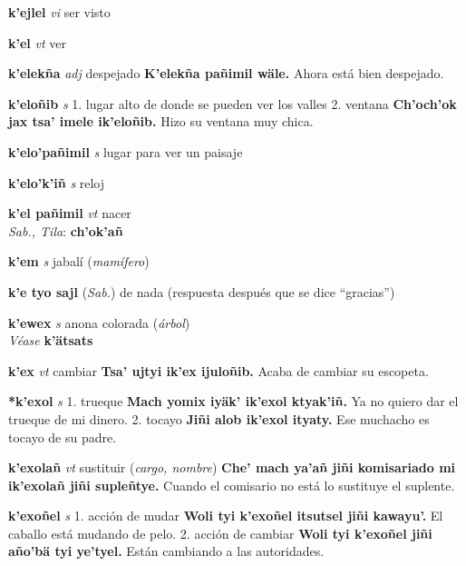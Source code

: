 \documentclass[10pt]{scrbook}
\newcommand{\entry}[1]{\textbf{#1}}
\newcommand{\onedefinition}[1]{#1.}
\newcommand{\partofspeech}[1]{\textit{#1}}
\newcommand{\spanishtranslation}[1]{#1}
\newcommand{\clarification}[1]{(\textit{#1})}
\newcommand{\cholexample}[1]{\textbf{#1}}
\newcommand{\exampletranslation}[1]{#1}
\newcommand{\dialectvariant}[1]{\\\textit{#1}:}
\newcommand{\dialectword}[1]{\textbf{#1}}
\newcommand{\alsosee}[1]{\\\textit{Véase} \textbf{#1}}
\newcommand{\relevantdialect}[1]{(\textit{#1})}
\begin{document}
\begin{multicols}{2}
\entry{k'ejlel}
\partofspeech{vi}
\spanishtranslation{ser visto}

\entry{k'el}
\partofspeech{vt}
\spanishtranslation{ver}

\entry{k'elekña}
\partofspeech{adj}
\spanishtranslation{despejado}
\cholexample{K'elekña pañimil wäle.}
\exampletranslation{Ahora está bien despejado.}

\entry{k'eloñib}
\partofspeech{s}
\onedefinition{1}
\spanishtranslation{lugar alto de donde se pueden ver los valles}
\onedefinition{2}
\spanishtranslation{ventana}
\cholexample{Ch'och'ok jax tsa' imele ik'eloñib.}
\exampletranslation{Hizo su ventana muy chica.}

\entry{k'elo'pañimil}
\partofspeech{s}
\spanishtranslation{lugar para ver un paisaje}

\entry{k'elo'k'iñ}
\partofspeech{s}
\spanishtranslation{reloj}

\entry{k'el pañimil}
\partofspeech{vt}
\spanishtranslation{nacer}
\dialectvariant{Sab., Tila}
\dialectword{ch'ok'añ}

\entry{k'em}
\partofspeech{s}
\spanishtranslation{jabalí}
\clarification{mamífero}

\entry{k'e tyo sajl}
\relevantdialect{Sab.}
\spanishtranslation{de nada (respuesta después que se dice “gracias”)}

\entry{k'ewex}
\partofspeech{s}
\spanishtranslation{anona colorada}
\clarification{árbol}
\alsosee{k'ätsats}

\entry{k'ex}
\partofspeech{vt}
\spanishtranslation{cambiar}
\cholexample{Tsa' ujtyi ik'ex ijuloñib.}
\exampletranslation{Acaba de cambiar su escopeta.}

\entry{*k'exol}
\partofspeech{s}
\onedefinition{1}
\spanishtranslation{trueque}
\cholexample{Mach yomix iyäk' ik'exol ktyak'iñ.}
\exampletranslation{Ya no quiero dar el trueque de mi dinero.}
\onedefinition{2}
\spanishtranslation{tocayo}
\cholexample{Jiñi alob ik'exol ityaty.}
\exampletranslation{Ese muchacho es tocayo de su padre.}

\entry{k'exolañ}
\partofspeech{vt}
\spanishtranslation{sustituir}
\clarification{cargo, nombre}
\cholexample{Che' mach ya'añ jiñi komisariado mi ik'exolañ jiñi supleñtye.}
\exampletranslation{Cuando el comisario no está lo sustituye el suplente.}

\entry{k'exoñel}
\partofspeech{s}
\onedefinition{1}
\spanishtranslation{acción de mudar}
\cholexample{Woli tyi k'exoñel itsutsel jiñi kawayu'.}
\exampletranslation{El caballo está mudando de pelo.}
\onedefinition{2}
\spanishtranslation{acción de cambiar}
\cholexample{Woli tyi k'exoñel jiñi año'bä tyi ye'tyel.}
\exampletranslation{Están cambiando a las autoridades.}


\end{multicols}
\end{document}
